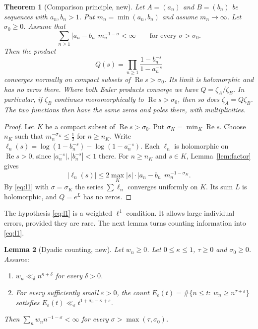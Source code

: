 \documentclass[12pt,letterpaper]{article}
\newtheorem{theorem}{Theorem}[section]
\newtheorem{lemma}[theorem]{Lemma}
\theoremstyle{definition}
\theoremstyle{remark}
\newcommand{\Ree}{\operatorname{Re}}
\newcommand{\eps}{\varepsilon}
\begin{document}
\begin{theorem}[Comparison principle, new]\label{thm:comparison}
Let $A=(a_n)$ and $B=(b_n)$ be sequences with $a_n,b_n>1$. Put
$m_n=\min(a_n,b_n)$ and assume $m_n\to\infty$. Let $\sigma_0\ge0$. Assume
that
\begin{equation}\label{eq:l1}
\sum_{n\ge1}|a_n-b_n|\,m_n^{-1-\sigma}<\infty
\qquad\text{for every }\sigma>\sigma_0.
\end{equation}
Then the product
\[
Q(s)=\prod_{n\ge1}\frac{1-b_n^{-s}}{1-a_n^{-s}}
\]
converges normally on compact subsets of $\Ree s>\sigma_0$. Its limit is
holomorphic and has no zeros there. Where both Euler products converge we
have $Q=\zeta_A/\zeta_B$. In particular, if $\zeta_B$ continues
meromorphically to $\Ree s>\sigma_0$, then so does $\zeta_A=Q\zeta_B$. The
two functions then have the same zeros and poles there, with
multiplicities.
\end{theorem}

\begin{proof}
Let $K$ be a compact subset of $\Ree s>\sigma_0$. Put
$\sigma_K=\min_K\Ree s$. Choose $n_K$ such that $m_n^{-\sigma_K}\le\frac12$
for $n\ge n_K$. Write
$\ell_n(s)=\log(1-b_n^{-s})-\log(1-a_n^{-s})$. Each $\ell_n$ is
holomorphic on $\Ree s>0$, since $|a_n^{-s}|,|b_n^{-s}|<1$ there. For
$n\ge n_K$ and $s\in K$, Lemma~\ref{lem:factor} gives
\[
|\ell_n(s)|\le 2\max_K|s|\cdot|a_n-b_n|\,m_n^{-1-\sigma_K}.
\]
By \eqref{eq:l1} with $\sigma=\sigma_K$ the series $\sum\ell_n$ converges
uniformly on $K$. Its sum $L$ is holomorphic, and $Q=e^L$ has no zeros.
\end{proof}

The hypothesis \eqref{eq:l1} is a weighted $\ell^1$ condition. It allows
large individual errors, provided they are rare. The next lemma turns
counting information into \eqref{eq:l1}.

\begin{lemma}[Dyadic counting, new]\label{lem:dyadic}
Let $w_n\ge0$. Let $0\le\kappa\le1$, $\tau\ge0$ and $\sigma_0\ge0$.
Assume:
\begin{enumerate}[label=(\roman*)]
\item $w_n\ll_\delta n^{\kappa+\delta}$ for every $\delta>0$.
\item For every sufficiently small $\eps>0$, the count
  $E_\eps(t)=\#\{n\le t:\ w_n\ge n^{\tau+\eps}\}$ satisfies
  $E_\eps(t)\ll_\eps t^{1+\sigma_0-\kappa+\eps}$.
\end{enumerate}
Then $\sum_n w_n n^{-1-\sigma}<\infty$ for every
$\sigma>\max(\tau,\sigma_0)$.
\end{lemma}
\end{document}
